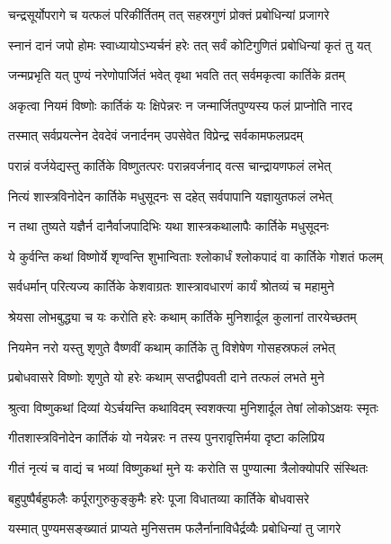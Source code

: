 \twolineshloka
{चन्द्रसूर्योपरागे च यत्फलं परिकीर्तितम्}%
{तत् सहस्रगुणं प्रोक्तं प्रबोधिन्यां प्रजागरे}

\twolineshloka
{स्नानं दानं जपो होमः स्वाध्यायोऽभ्यर्चनं हरेः}%
{तत् सर्वं कोटिगुणितं प्रबोधिन्यां कृतं तु यत्}

\twolineshloka
{जन्मप्रभृति यत् पुण्यं नरेणोपार्जितं भवेत्}%
{वृथा भवति तत् सर्वमकृत्वा कार्तिके व्रतम्}

\twolineshloka
{अकृत्वा नियमं विष्णोः कार्तिकं यः क्षिपेन्नरः}%
{न जन्मार्जितपुण्यस्य फलं प्राप्नोति नारद}

\twolineshloka
{तस्मात् सर्वप्रयत्नेन देवदेवं जनार्दनम्}%
{उपसेवेत विप्रेन्द्र सर्वकामफलप्रदम्}

\twolineshloka
{परान्नं वर्जयेद्यस्तु कार्तिके विष्णुतत्परः}%
{परान्नवर्जनाद् वत्स चान्द्रायणफलं लभेत्}

\twolineshloka
{नित्यं शास्त्रविनोदेन कार्तिके मधुसूदनः}%
{स दहेत् सर्वपापानि यज्ञायुतफलं लभेत्}

\twolineshloka
{न तथा तुष्यते यज्ञैर्न दानैर्वाजपादिभिः}%
{यथा शास्त्रकथालापैः कार्तिके मधुसूदनः}

\twolineshloka
{ये कुर्वन्ति कथां विष्णोर्ये शृण्वन्ति शुभान्विताः}%
{श्लोकार्धं श्लोकपादं वा कार्तिके गोशतं फलम्}

\twolineshloka
{सर्वधर्मान् परित्यज्य कार्तिके केशवाग्रतः}%
{शास्त्रावधारणं कार्यं श्रोतव्यं च महामुने}

\twolineshloka
{श्रेयसा लोभबुद्ध्या च यः करोति हरेः कथाम्}%
{कार्तिके मुनिशार्दूल कुलानां तारयेच्छतम्}

\twolineshloka
{नियमेन नरो यस्तु शृणुते वैष्णवीं कथाम्}%
{कार्तिके तु विशेषेण गोसहस्रफलं लभेत्}

\twolineshloka
{प्रबोधवासरे विष्णोः शृणुते यो हरेः कथाम्}%
{सप्तद्वीपवती दाने तत्फलं लभते मुने}

\twolineshloka
{श्रुत्वा विष्णुकथां दिव्यां येऽर्चयन्ति कथाविदम्}%
{स्वशक्त्या मुनिशार्दूल तेषां लोकोऽक्षयः स्मृतः}

\twolineshloka
{गीतशास्त्रविनोदेन कार्तिकं यो नयेन्नरः}%
{न तस्य पुनरावृत्तिर्मया दृष्टा कलिप्रिय}

\twolineshloka
{गीतं नृत्यं च वाद्यं च भव्यां विष्णुकथां मुने}%
{यः करोति स पुण्यात्मा त्रैलोक्योपरि संस्थितः}

\twolineshloka
{बहुपुष्पैर्बहुफलैः कर्पूरागुरुकुङ्कुमैः}%
{हरेः पूजा विधातव्या कार्तिके बोधवासरे}

\twolineshloka
{यस्मात् पुण्यमसङ्ख्यातं प्राप्यते मुनिसत्तम}%
{फलैर्नानाविधैर्द्रव्यैः प्रबोधिन्यां तु जागरे}

